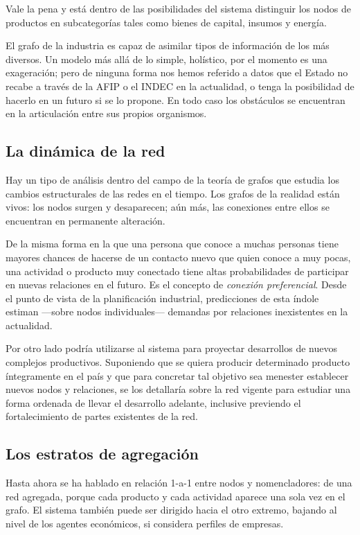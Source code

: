 \documentclass[a4paper]{report}
\begin{document}
Vale la pena y está dentro de las posibilidades del sistema distinguir los nodos de productos en subcategorías tales como bienes de capital, insumos y energía.

El grafo de la industria es capaz de asimilar tipos de información de los más diversos. Un modelo más allá de lo simple, holístico, por el momento es una exageración; pero de ninguna forma nos hemos referido a datos que el Estado no recabe a través de la AFIP o el INDEC en la actualidad, o tenga la posibilidad de hacerlo en un futuro si se lo propone. En todo caso los obstáculos se encuentran en la articulación entre sus propios organismos.

\subsection*{La dinámica de la red}

Hay un tipo de análisis dentro del campo de la teoría de grafos que estudia los cambios estructurales de las redes en el tiempo. Los grafos de la realidad están vivos: los nodos surgen y desaparecen; aún más, las conexiones entre ellos se encuentran en permanente alteración.

De la misma forma en la que una persona que conoce a muchas personas tiene mayores chances de hacerse de un contacto nuevo que quien conoce a muy pocas, una actividad o producto muy conectado tiene altas probabilidades de participar en nuevas relaciones en el futuro. Es el concepto de \textit{conexión preferencial}. Desde el punto de vista de la planificación industrial, predicciones de esta índole estiman —sobre nodos individuales— demandas por relaciones inexistentes en la actualidad.

Por otro lado podría utilizarse al sistema para proyectar desarrollos de nuevos complejos productivos. Suponiendo que se quiera producir determinado producto íntegramente en el país y que para concretar tal objetivo sea menester establecer nuevos nodos y relaciones, se los detallaría sobre la red vigente para estudiar una forma ordenada de llevar el desarrollo adelante, inclusive previendo el fortalecimiento de partes existentes de la red.

\subsection*{Los estratos de agregación}

Hasta ahora se ha hablado en relación 1-a-1 entre nodos y nomencladores: de una red agregada, porque cada producto y cada actividad aparece una sola vez en el grafo. El sistema también puede ser dirigido hacia el otro extremo, bajando al nivel de los agentes económicos, si considera perfiles de empresas.
\end{document}
